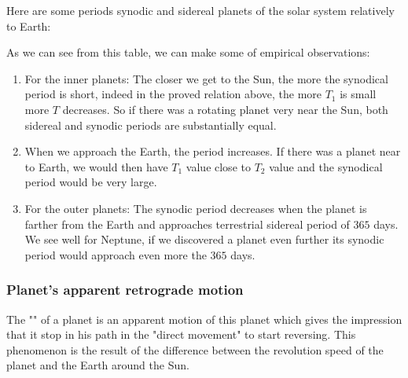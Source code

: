 	Here are some periods synodic and sidereal planets of the solar system relatively to Earth:
		
	As we can see from this table, we can make some of empirical observations:
	\begin{enumerate}
		\item For the inner planets: The closer we get to the Sun, the more the synodical period is short, indeed in the proved relation above, the more $T_1$ is small more $T$ decreases. So if there was a rotating planet very near the Sun, both sidereal and synodic periods are substantially equal.

		\item When we approach the Earth, the period increases. If there was a planet near to Earth, we would then have $T_1$ value close to $T_2$ value and the synodical period would be very large.

		\item For the outer planets: The synodic period decreases when the planet is farther from the Earth and approaches terrestrial sidereal period of $365$ days. We see well for Neptune, if we discovered a planet even further its synodic period would approach even more the $365$ days.
	\end{enumerate}
	
	\pagebreak
	\subsubsection{Planet's apparent retrograde motion}
	The "" of a planet is an apparent motion of this planet which gives the impression that it stop in his path in the "direct movement" to start reversing. This phenomenon is the result of the difference between the revolution speed of the planet and the Earth around the Sun.


